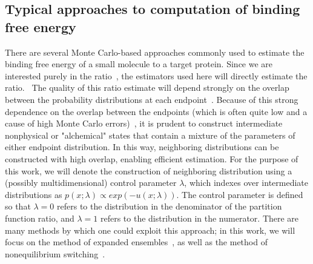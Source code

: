 \subsection{Typical approaches to computation of binding free energy}
%
There are several Monte Carlo-based approaches commonly used to estimate the binding free energy of a small molecule to a target protein.
%
Since we are interested purely in the ratio~\cite{Gelman1998, Gilson1997, Shirts2008}, the estimators used here will directly estimate the ratio.~\cite{Shirts2008,Meng1996SimulatingRO,Gelman1998}
%
The quality of this ratio estimate will depend strongly on the overlap between the probability distributions at each endpoint~\cite{Meng1996SimulatingRO, Gelman1998}.
%
Because of this strong dependence on the overlap between the endpoints (which is often quite low and a cause of high Monte Carlo errors)~\cite{Gelman1998}, it is prudent to construct intermediate nonphysical or "alchemical" states that contain a mixture of the parameters of either endpoint distribution.
%
In this way, neighboring distributions can be constructed with high overlap, enabling efficient estimation.
%
For the purpose of this work, we will denote the construction of neighboring distribution using a (possibly multidimensional) control parameter $\lambda$, which indexes over intermediate distributions as $p(x; \lambda) \propto exp(-u(x; \lambda))$.
%
The control parameter is defined so that $\lambda=0$ refers to the distribution in the denominator of the partition function ratio, and $\lambda=1$ refers to the distribution in the numerator.
%
There are many methods by which one could exploit this approach; in this work, we will focus on the method of expanded ensembles~\cite{lyubartsev1992}, as well as the method of nonequilibrium switching~\cite{Hummer2001, Aldeghi2018}.
%
